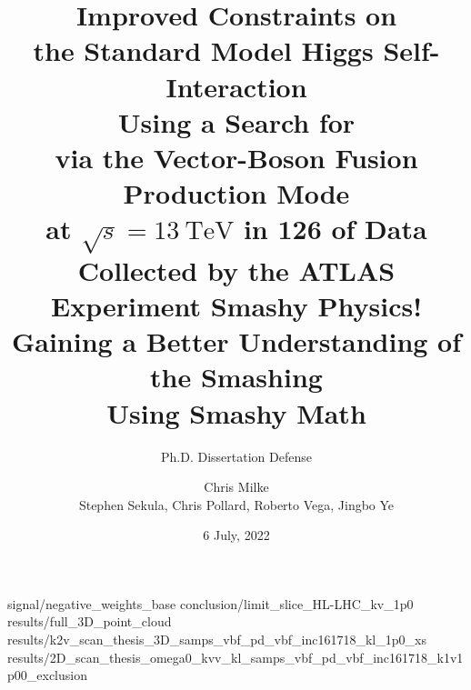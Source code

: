 \documentclass{beamer}
\begin{document}
\title{
    Improved Constraints on \\the Standard Model Higgs Self-Interaction \\
    Using a Search for \hhbbbb \\via the Vector-Boson Fusion Production Mode \\
    at $\sqrt{s}=13~\mathrm{TeV}$ in 126 \ifb of Data \\Collected by the ATLAS Experiment
}
\subtitle{\vspace{3mm}Ph.D. Dissertation Defense}

\author{Chris Milke\\{\small Stephen Sekula, Chris Pollard, Roberto Vega, Jingbo Ye}}
\date{6 July, 2022}

\frame{\titlepage}
\title{
    Smashy Physics!\\Gaining a Better Understanding of the Smashing\\Using Smashy Math
}
\frame{\titlepage}
%

%
%

{signal/negative_weights_base}
{conclusion/limit_slice_HL-LHC_kv_1p0} %
{results/full_3D_point_cloud}
{results/k2v_scan_thesis_3D_samps_vbf_pd_vbf_inc161718_kl_1p0_xs}
{results/2D_scan_thesis_omega0_kvv_kl_samps_vbf_pd_vbf_inc161718_k1v1p00_exclusion}


%
%
%
%
\end{document}
